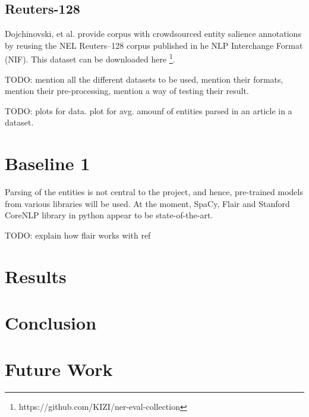 \documentclass{article}
\begin{document}
		\subsection{Reuters-128}
		Dojchinovski, et al. provide corpus  with  crowdsourced entity salience annotations by reusing the NEL Reuters–128 corpus published in he NLP Interchange Format (NIF). This dataset can be downloaded here \footnote[1]{https://github.com/KIZI/ner-eval-collection}.
	
	TODO: mention all the different datasets to be used, mention their formats, mention their pre-processing, mention a way of testing their result.
	
	TODO: plots for data. plot for avg. amounf of entities parsed in an article in a dataset.
		
	\section{Baseline 1}
	Parsing of the entities is not central to the project, and hence, pre-trained models from various libraries will be used. At the moment, SpaCy, Flair and Stanford CoreNLP library in python appear to be state-of-the-art.
	
	TODO: explain how flair works with ref
	
	
	\section{Results}
	
	\section{Conclusion}
	
	\section{Future Work}
	
\end{document}
